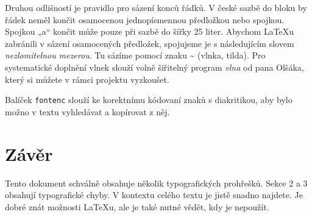 \documentclass[twocolumn]{article}
\begin{document}
Druhou odlišností je pravidlo pro sázení konců řádků.
V české sazbě do bloku by řádek neměl končit osamocenou jednopísmennou předložkou nebo spojkou.
Spojkou „a“ končit může pouze při sazbě do šířky 25 liter.
Abychom \LaTeX u zabránili v sázení osamocených předložek, spojujeme je s následujícím slovem \emph{nezlomitelnou mezerou}.
Tu sázíme pomocí znaku \~{} (vlnka, tilda).
Pro systematické doplnění vlnek slouží volně šiřitelný program \emph{vlna} od pana Olšáka\footnotemark, který si můžete v rámci projektu vyzkoušet.

Balíček \texttt{fontenc} slouží ke korektnímu kódovaní znaků s diakritikou, aby bylo možno v textu vyhledávat a kopírovat z něj.


\section{Závěr}

Tento dokument schválně obsahuje několik typografických prohřešků.
Sekce 2 a 3 obsahují typografické chyby.
V kontextu celého textu je jistě snadno najdete.
Je dobré znát možnosti \LaTeX u, ale je také nutné vědět, kdy je nepoužít.

    
\end{document}
